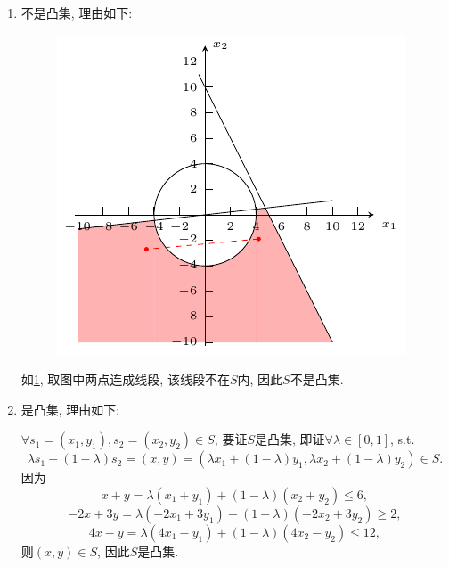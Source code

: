 \begin{enumerate}[label=\alph*)]
    \item
        不是凸集, 理由如下:

        \begin{figure}[ht]
            \centering
            \includegraphics[scale=1.2]{figures/2a.pdf}
            \caption{}
            \label{figure:2a}
        \end{figure}
        如\cref{figure:2a}, 取图中两点连成线段, 该线段不在$S$内, 因此$S$不是凸集.
    \item
        是凸集, 理由如下:

        $\forall s_1=(x_1,y_1),s_2=(x_2,y_2)\in S$, 要证$S$是凸集, 即证$\forall\lambda\in[0,1]$, s.t.
        \begin{equation*}
            \lambda s_1+(1-\lambda)s_2
            =(x,y)
            =(\lambda x_1+(1-\lambda)y_1, \lambda x_2+(1-\lambda)y_2)
            \in S.
        \end{equation*}
        因为
        \begin{equation*}
            x + y
            =\lambda(x_1+y_1)+(1-\lambda)(x_2+y_2)
            \leq6,
        \end{equation*}
        \begin{equation*}
            -2x + 3y
            =\lambda(-2x_1+3y_1)+(1-\lambda)(-2x_2+3y_2)
            \geq2,
        \end{equation*}
        \begin{equation*}
            4x - y
            =\lambda(4x_1-y_1)+(1-\lambda)(4x_2-y_2)
            \leq12,
        \end{equation*}
        则$(x,y)\in S$, 因此$S$是凸集.


\end{enumerate}
